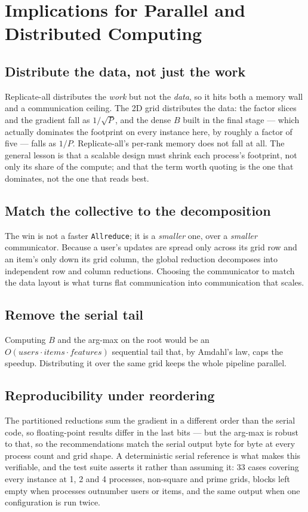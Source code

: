 \documentclass[twocolumn]{article}
\begin{document}
    \section{Implications for Parallel and Distributed Computing}\label{sec:pdc}

    \subsection{Distribute the data, not just the work}\label{subsec:distribute}
    Replicate-all distributes the \emph{work} but not the \emph{data}, so it hits both a
    memory wall and a communication ceiling. The 2D grid distributes the data: the factor
    slices and the gradient fall as $1/\sqrt{P}$, and the dense $B$ built in the final
    stage --- which actually dominates the footprint on every instance here, by roughly a
    factor of five --- falls as $1/P$. Replicate-all's per-rank memory does not fall at
    all. The general lesson is that a scalable design must shrink each process's
    footprint, not only its share of the compute; and that the term worth quoting is the
    one that dominates, not the one that reads best.

    \subsection{Match the collective to the decomposition}\label{subsec:collective}
    The win is not a faster \texttt{Allreduce}; it is a \emph{smaller} one, over a
    \emph{smaller} communicator. Because a user's updates are spread only across its grid
    row and an item's only down its grid column, the global reduction decomposes into
    independent row and column reductions. Choosing the communicator to match the data
    layout is what turns flat communication into communication that scales.

    \subsection{Remove the serial tail}\label{subsec:tail}
    Computing $B$ and the arg-max on the root would be an
    $O(\textit{users} \cdot \textit{items} \cdot \textit{features})$ sequential tail that,
    by Amdahl's law, caps the speedup. Distributing it over the same grid keeps the whole
    pipeline parallel.

    \subsection{Reproducibility under reordering}\label{subsec:repro}
    The partitioned reductions sum the gradient in a different order than the serial code,
    so floating-point results differ in the last bits --- but the arg-max is robust to
    that, so the recommendations match the serial output byte for byte at every process
    count and grid shape. A deterministic serial reference is what makes this verifiable,
    and the test suite asserts it rather than assuming it: 33 cases covering every
    instance at 1, 2 and 4 processes, non-square and prime grids, blocks left empty when
    processes outnumber users or items, and the same output when one configuration is
    run twice.
\end{document}
